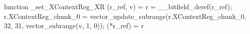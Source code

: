 function _set_XContextReg_XR (r_ref, v) = {
    r = __bitfield_deref(r_ref);
    r.XContextReg_chunk_0 = vector_update_subrange(r.XContextReg_chunk_0, 32, 31, vector_subrange(v, 1, 0));
    (*r_ref) = r
}
